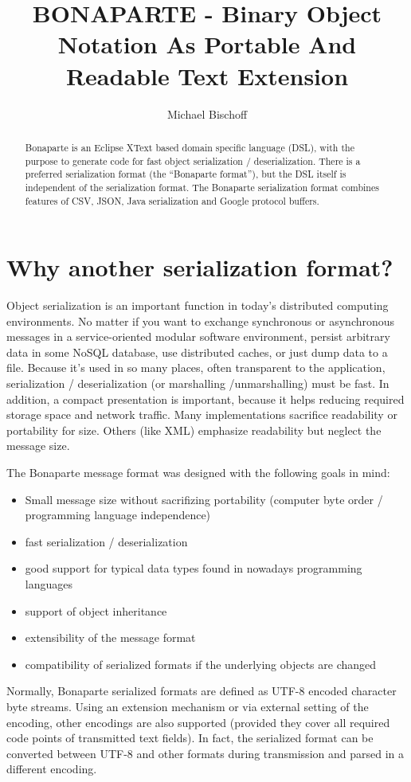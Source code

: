 \documentclass[11pt,a4paper,oneside]{article}
\title{BONAPARTE - Binary Object Notation As Portable And Readable Text
Extension}
\author{Michael Bischoff}
\begin{document}
\maketitle
\begin{abstract}
Bonaparte is an Eclipse XText based domain specific language (DSL), with the purpose to generate code for fast object serialization / deserialization.
There is a preferred serialization format (the ``Bonaparte format''), but the DSL itself is independent of the serialization format. 
The Bonaparte serialization format combines features of CSV, JSON, Java serialization and Google protocol buffers.
\end{abstract}
\section{Why another serialization format?}
Object serialization is an important function in today's distributed computing
environments. No matter if you want to exchange synchronous or asynchronous
messages in a service-oriented modular software environment, persist
arbitrary data in some NoSQL database, use distributed caches, or just dump data
to a file.
Because it's used in so many places, often transparent to the application,
serialization / deserialization (or marshalling /unmarshalling) must be fast. In
addition, a compact presentation is important, because it helps reducing
required storage space and network traffic.
Many implementations sacrifice readability or portability for size. Others (like XML)
emphasize readability but neglect the message size.

The Bonaparte message format was designed with the following goals in mind:
\begin{itemize}
  \item Small message size without sacrifizing portability (computer byte order
  / programming language independence)
  \item fast serialization / deserialization
  \item good support for typical data types found in nowadays programming
  languages
  \item support of object inheritance
  \item extensibility of the message format
  \item compatibility of serialized formats if the underlying objects are
  changed
\end{itemize}
Normally, Bonaparte serialized formats are defined as UTF-8 encoded character byte streams.
Using an extension mechanism or via external setting of the encoding, other encodings are also supported (provided they cover all required code points of transmitted text fields).
In fact, the serialized format can be converted between UTF-8 and other formats during transmission and parsed in a different encoding. 
\end{document}
